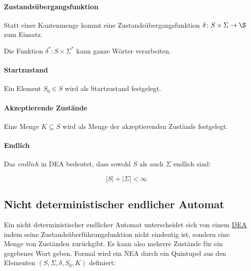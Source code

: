 \documentclass[../main.tex]{subfiles}
\begin{document}
                \paragraph{Zustandsübergangsfunktion}
                    Statt einer Kantenmenge kommt eine Zustandsübergangsfunktion $\delta\colon S \times \Sigma \rightarrow \S$ zum Einsatz.
                    
                    Die Funktion $\delta^*\colon S \times \Sigma^*$ kann ganze Wörter verarbeiten.
                    
                
                    
                \paragraph{Startzustand}
                    Ein Element $S_0 \in S$ wird als Startzustand festgelegt.
                
                \paragraph{Akzeptierende Zustände}
                    Eine Menge $K \subseteq S$ wird als Menge der akzeptierenden Zustände festgelegt.
                    
                \paragraph{Endlich}
                    Das \emph{endlich} in DEA bedeutet, dass sowohl $S$ als auch $\Sigma$ endlich sind:
                    
                    \begin{equation}
                        |S| + |\Sigma| < \infty
                    \end{equation}
                    
        \subsection[NEA]{Nicht deterministischer endlicher Automat}
            Ein nicht deterministischer endlicher Automat unterscheidet sich von einem \hyperref[section:DiskreteMathematik:FormaleGrundlagen:DEA]{DEA} indem seine Zustandsüberführungsfunktion nicht eindeutig ist, sondern eine Menge von Zuständen zurückgibt. Es kann also mehrere Zustände für ein gegebenes Wort geben.
            Formal wird ein NEA durch ein Quintupel aus den Elementen $(S, \Sigma, \delta, S_0, K)$ definiert:
            
\end{document}
